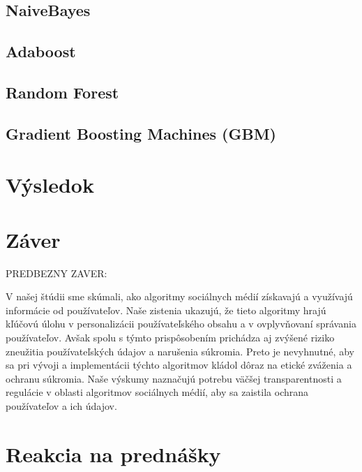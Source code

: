\documentclass[12pt,twoside,slovak,a4paper]{article}
\begin{document}
\subsection{NaiveBayes\cite{7809906}}

\subsection{Adaboost\cite{7087040}}

\subsection{Random Forest\cite{9952138}}

\subsection{Gradient Boosting Machines (GBM)\cite{9952143}}
















\section{Výsledok}


\section{Záver} 

PREDBEZNY ZAVER:

V našej štúdii sme skúmali, ako algoritmy sociálnych médií získavajú a využívajú informácie od používateľov. Naše zistenia ukazujú, že tieto algoritmy hrajú kľúčovú úlohu v personalizácii používateľského obsahu a v ovplyvňovaní správania používateľov. Avšak spolu s týmto prispôsobením prichádza aj zvýšené riziko zneužitia používateľských údajov a narušenia súkromia. Preto je nevyhnutné, aby sa pri vývoji a implementácii týchto algoritmov kládol dôraz na etické zváženia a ochranu súkromia. Naše výskumy naznačujú potrebu väčšej transparentnosti a regulácie v oblasti algoritmov sociálnych médií, aby sa zaistila ochrana používateľov a ich údajov.




\section{Reakcia na prednášky}
\end{document}
